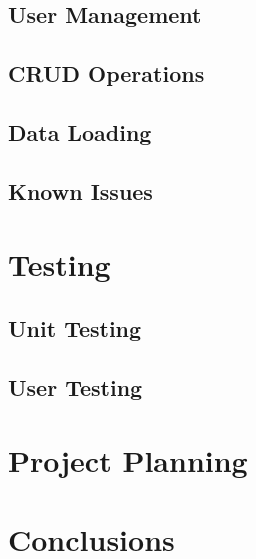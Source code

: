 \documentclass[12pt, a4paper,twoside]{report}
\theoremstyle{plain} %
\theoremstyle{definition} %
\numberwithin{equation}{chapter}
\begin{document}
\section{User Management}\label{sec:usermanagement}

\section{CRUD Operations}\label{sec:crudoperations}

\section{Data Loading}\label{sec:dataloading}

\section{Known Issues}\label{sec:knownissues}


\chapter{Testing}\label{ch:testing}

\section{Unit Testing}\label{sec:unittesting}

\section{User Testing}\label{sec:usertesting}


\chapter {Project Planning}\label{ch:projectplanning}


\chapter{Conclusions}\label{ch:conclusion}



\end{document}
